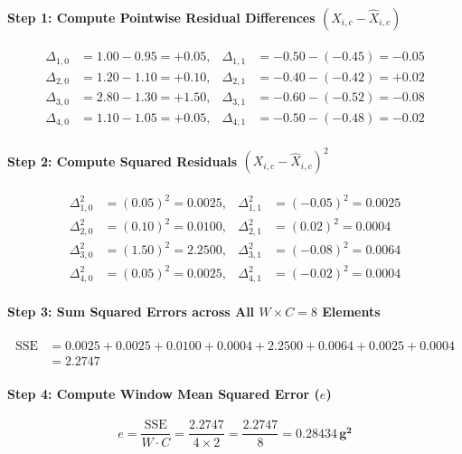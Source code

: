 \begin{example}
\paragraph{Step 1: Compute Pointwise Residual Differences $(X_{i,c} - \hat{X}_{i,c})$}
\begin{align*}
\Delta_{1,0} &= 1.00 - 0.95 = +0.05, & \Delta_{1,1} &= -0.50 - (-0.45) = -0.05 \\
\Delta_{2,0} &= 1.20 - 1.10 = +0.10, & \Delta_{2,1} &= -0.40 - (-0.42) = +0.02 \\
\Delta_{3,0} &= 2.80 - 1.30 = \mathbf{+1.50}, & \Delta_{3,1} &= -0.60 - (-0.52) = -0.08 \\
\Delta_{4,0} &= 1.10 - 1.05 = +0.05, & \Delta_{4,1} &= -0.50 - (-0.48) = -0.02
\end{align*}

\paragraph{Step 2: Compute Squared Residuals $(X_{i,c} - \hat{X}_{i,c})^2$}
\begin{align*}
\Delta_{1,0}^2 &= (0.05)^2 = 0.0025, & \Delta_{1,1}^2 &= (-0.05)^2 = 0.0025 \\
\Delta_{2,0}^2 &= (0.10)^2 = 0.0100, & \Delta_{2,1}^2 &= (0.02)^2 = 0.0004 \\
\Delta_{3,0}^2 &= (1.50)^2 = \mathbf{2.2500}, & \Delta_{3,1}^2 &= (-0.08)^2 = 0.0064 \\
\Delta_{4,0}^2 &= (0.05)^2 = 0.0025, & \Delta_{4,1}^2 &= (-0.02)^2 = 0.0004
\end{align*}

\paragraph{Step 3: Sum Squared Errors across All $W \times C = 8$ Elements}
\begin{align*}
\text{SSE} &= 0.0025 + 0.0025 + 0.0100 + 0.0004 + 2.2500 + 0.0064 + 0.0025 + 0.0004 \\
&= \mathbf{2.2747}
\end{align*}

\paragraph{Step 4: Compute Window Mean Squared Error ($e$)}
\begin{equation*}
e = \frac{\text{SSE}}{W \cdot C} = \frac{2.2747}{4 \times 2} = \frac{2.2747}{8} = \mathbf{0.28434\,\text{g}^2}
\end{equation*}


\end{example}
